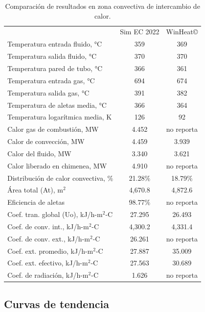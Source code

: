 \begin{table}
\begin{center}
\caption[Resultados en zona convectiva de intercambio de calor]{Comparación de resultados en zona convectiva de intercambio de calor.}
\label{tbl:compara-zc}
\begin{tabular}{l|c|c}
	& Sim EC 2022 & WinHeat\copyright \\
Temperatura entrada fluido, °C		& 359 & 369	\\
Temperatura salida fluido, °C		& 370 & 370	\\
Temperatura pared de tubo, °C		& 366 & 361	\\
Temperatura entrada gas, °C			& 694 & 674	\\
Temperatura salida gas, °C			& 391 & 382	\\
Temperatura de aletas media, °C     & 366 & 364\\
Temperatura logarítmica media, K	& 126 & 92 \\

Calor gas de combustión, MW		& 4.452 & no reporta \\
Calor de convección, MW			& 4.459 & 3.939	\\
Calor del fluido, MW			& 3.340 & 3.621	\\
Calor liberado en chimenea, MW	& 4.910 & no reporta \\

Distribución de calor convectiva, \%	& 21.28\% &  18.79\% \\

Área total (At), m$^2$			& 4,670.8 & 4,872.6 \\
Eficiencia de aletas			& 98.77\% & no reporta \\

Coef. tran. global (Uo), kJ/h-m$^2$-C	& 27.295 & 26.493 \\
Coef. de conv. int., kJ/h-m$^2$-C	& 4,300.2 & 4,331.4 \\
Coef. de conv. ext., kJ/h-m$^2$-C	& 26.261 & no reporta \\
Coef. ext. promedio, kJ/h-m$^2$-C	& 27.887 & 35.009 \\
Coef. ext. efectivo, kJ/h-m$^2$-C	& 27.563 & 30.689 \\
Coef. de radiación, kJ/h-m$^2$-C	& 1.626  & no reporta \\
\end{tabular}
\end{center}
\end{table}

\subsection{Curvas de tendencia}

